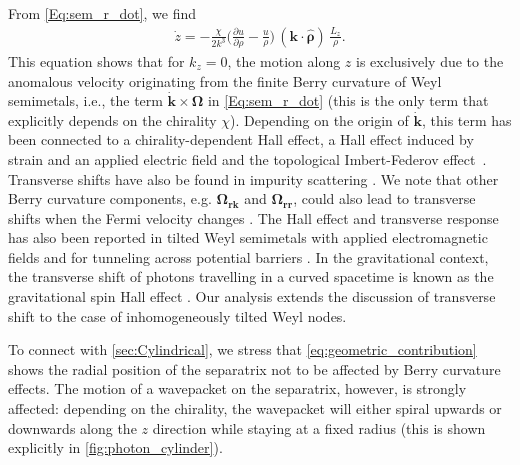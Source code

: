 \documentclass[submission, Phys]{SciPost}
\begin{document}
From \cref{Eq:sem_r_dot}, we find 
\begin{align}
    \dot{z} = -\frac{\chi}{2 k^3} \bigg( \frac{\partial u}{\partial \rho} -\frac{u}{\rho}\bigg)\, (\bm k \cdot \hat{\bm \rho})\, \frac{L_z}{\rho}.
    \label{eq:geometric_contribution}
\end{align}
This equation shows that for $k_z=0$, the motion along $z$ is exclusively due to the anomalous velocity originating from the finite Berry curvature of Weyl semimetals, i.e., the term $\dot{\bm{k}}\times\bm{\Omega}$ in \cref{Eq:sem_r_dot} (this is the only term that explicitly depends on the chirality $\chi$).
Depending on the origin of $\dot{\bm{k}}$, this term has been connected to a chirality-dependent Hall effect\cite{Yang_2015}, a Hall effect induced by strain and an applied electric field \cite{Heidari20} and the topological Imbert-Federov effect~\cite{Jiang15}.
Transverse shifts have also be found in impurity scattering \cite{QDJiang16}.
We note that  other Berry curvature components, e.g. $\bm\Omega_{\bm r\bm k}$ and $\bm\Omega_{\bm r\bm r}$, could also lead to transverse shifts when the Fermi velocity changes \cite{Yang_2015}.
The Hall effect and transverse response has also been reported in tilted Weyl semimetals with applied electromagnetic fields \cite{Ma19,Kundu_2020} and for tunneling across potential barriers \cite{Yesilyurt19}.
In the gravitational context, the transverse shift of photons travelling in a curved spacetime is known as the gravitational spin Hall effect \cite{gosselin,Oancea20,Harte22}.
Our analysis extends the discussion of transverse shift to the case of inhomogeneously tilted Weyl nodes.

To connect with \cref{sec:Cylindrical}, we stress that \cref{eq:geometric_contribution} shows the radial position of the separatrix not to be affected by Berry curvature effects.
The motion of a wavepacket on the separatrix, however, is strongly affected: depending on the chirality, the wavepacket will either spiral upwards or downwards along the $z$ direction while staying at a fixed radius (this is shown explicitly in \cref{fig:photon_cylinder}).
\end{document}
